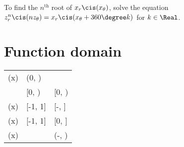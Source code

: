 To find the $n^{\text{th}}$ root of $x_r \cis(x_{\theta})$, solve the equation $z_r^n \cis(nz_{\theta}) = x_r \cis(x_{\theta} + 360\degree k)$ for $k \in \Real$.

\section{Function domain}

\begin{center}
	\begin{tabular}{L L L} 
		 &  &  \\ 
		\hline
		\log(x) & (0, \infty) & \Real \\
		 & [0, \infty) & [0, \infty) \\
		\arcsin(x) & [-1, 1] & [-, ] \\
		\arccos(x) & [-1, 1] & [0, \pi] \\
		\arctan(x) & \Real & (-, ) \\
	\end{tabular}
\end{center}